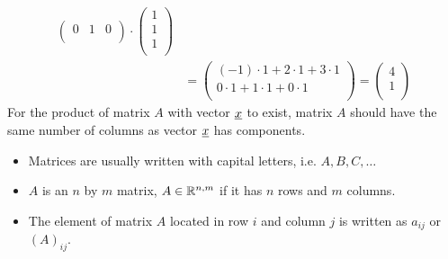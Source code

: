 \begin{example}
\begin{enumerate}
\begin{align*}
\begin{pmatrix}
0 & 1 & 0\\
\end{pmatrix}
\cdot
\begin{pmatrix}
1\\
1\\
1\\
\end{pmatrix}
 \\ &= 
\begin{pmatrix} 
 (-1) \cdot 1 + 2 \cdot 1 + 3 \cdot 1\\ 
 0 \cdot 1 + 1 \cdot 1 + 0 \cdot 1\\
\end{pmatrix} 
 = 
 \begin{pmatrix} 
 4\\ 
 1\\
\end{pmatrix}
\end{align*}
For the product of matrix $A$ with vector $\underline{x}$ to exist, matrix $A$ should have the same number of columns as vector $\underline{x}$ has components.
\end{enumerate}
\end{example}
\begin{notation}
\begin{itemize}
\item Matrices are usually written with capital letters, i.e. $A,B,C,\dots$
\item $A$ is an $n$ by $m$ matrix, $A\in\mathbb{R}^{n,m}$	 if it has $n$ rows and $m$ columns.
\item The element of matrix $A$ located in row $i$ and column $j$ is written as $a_{ij}$ or $(A)_{ij}$.
\end{itemize}
\end{notation}

